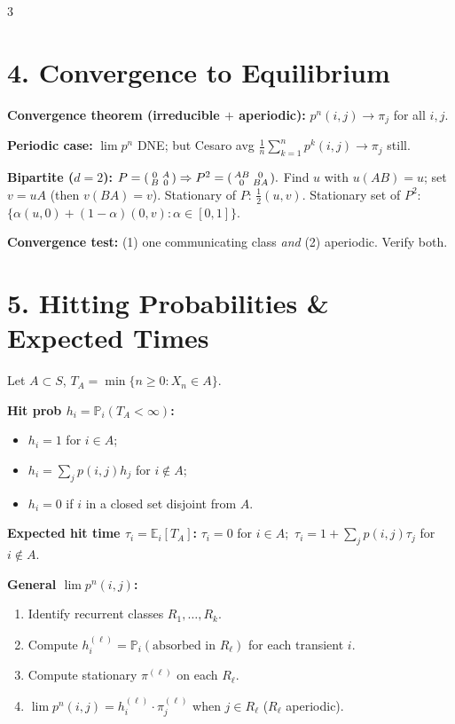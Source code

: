 \documentclass[8pt]{extarticle}
\newcommand{\E}{\mathbb{E}}
\newcommand{\PR}{\mathbb{P}}
\begin{document}
\begin{multicols*}{3}
		\section*{4. Convergence to Equilibrium}
		
		\textbf{Convergence theorem (irreducible $+$ aperiodic):} $p^n(i,j)\to\pi_j$ for all $i,j$.
		
		\textbf{Periodic case:} $\lim p^n$ DNE; but Cesaro avg $\frac1n\sum_{k=1}^n p^k(i,j)\to\pi_j$ still.
		
		\textbf{Bipartite ($d=2$):} $P=\begin{psmallmatrix}0 & A\\ B & 0\end{psmallmatrix}\Rightarrow P^2=\begin{psmallmatrix}AB & 0\\ 0 & BA\end{psmallmatrix}.$ Find $u$ with $u(AB)=u$; set $v=uA$ (then $v(BA)=v$). Stationary of $P$: $\frac12(u,v)$. Stationary set of $P^2$: $\{\alpha(u,0)+(1-\alpha)(0,v):\alpha\in[0,1]\}$.
		
		\textbf{Convergence test:} (1) one communicating class \emph{and} (2) aperiodic. Verify both.
		
		\section*{5. Hitting Probabilities \& Expected Times}
		
		Let $A\subset S$, $T_A=\min\{n\ge 0:X_n\in A\}$.
		
		\textbf{Hit prob $h_i=\PR_i(T_A<\infty)$:}
		\begin{itemize}
			\item $h_i=1$ for $i\in A$;
			\item $h_i=\sum_j p(i,j)h_j$ for $i\notin A$;
			\item $h_i=0$ if $i$ in a closed set disjoint from $A$.
		\end{itemize}
		
		\textbf{Expected hit time $\tau_i=\E_i[T_A]$:} $\tau_i=0$ for $i\in A$;\ $\tau_i=1+\sum_j p(i,j)\tau_j$ for $i\notin A$.
		
		\textbf{General $\lim p^n(i,j)$:}
		\begin{enumerate}
			\item Identify recurrent classes $R_1,\dots,R_k$.
			\item Compute $h^{(\ell)}_i=\PR_i(\text{absorbed in }R_\ell)$ for each transient $i$.
			\item Compute stationary $\pi^{(\ell)}$ on each $R_\ell$.
			\item $\lim p^n(i,j)=h^{(\ell)}_i\cdot\pi^{(\ell)}_j$ when $j\in R_\ell$ ($R_\ell$ aperiodic).
		\end{enumerate}
		

\end{multicols*}
\end{document}
